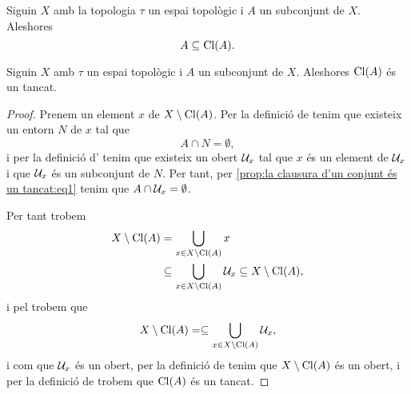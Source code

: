 \documentclass[../Apunts.tex]{subfiles}
\begin{document}
	\begin{observation}
		\label{obs:la clausura d'un conjunt conté el conjunt}
		Siguin \(X\) amb la topologia \(\tau\) un espai topològic i \(A\) un subconjunt de \(X\). Aleshores
		\[A\subseteq\operatorname{Cl}(A).\]
	\end{observation}
	\begin{proposition}
		\label{prop:la clausura d'un conjunt és un tancat}
		Siguin \(X\) amb \(\tau\) un espai topològic i \(A\) un subconjunt de \(X\). Aleshores \(\operatorname{Cl}(A)\) és un tancat.
		\begin{proof}
			 Prenem un element \(x\) de \(X\setminus\operatorname{Cl}(A)\). Per la definició de  tenim que existeix un entorn \(N\) de \(x\) tal que
			 \begin{equation}
			 	\label{prop:la clausura d'un conjunt és un tancat:eq1}
				 A\cap N=\emptyset,
			 \end{equation}
			 i per la definició d' tenim que existeix un obert \(\mathcal{U}_{x}\) tal que \(x\) és un element de \(\mathcal{U}_{x}\) i que \(\mathcal{U}_{x}\) és un subconjunt de \(N\). Per tant, per \eqref{prop:la clausura d'un conjunt és un tancat:eq1} tenim que \(A\cap\mathcal{U}_{x}=\emptyset\).
			 
			 Per tant trobem
			 \begin{align*}
				 X\setminus\operatorname{Cl}(A)&=\bigcup_{x\in X\setminus\operatorname{Cl}(A)}x \\
				 &\subseteq\bigcup_{x\in X\setminus\operatorname{Cl}(A)}\mathcal{U}_{x}\subseteq X\setminus\operatorname{Cl}(A),
			 \end{align*}
			 i pel  trobem que
			 \[X\setminus\operatorname{Cl}(A)=\subseteq\bigcup_{x\in X\setminus\operatorname{Cl}(A)}\mathcal{U}_{x},\]
			 i com que \(\mathcal{U}_{x}\) és un obert, per la definició de  tenim que \(X\setminus\operatorname{Cl}(A)\) és un obert, i per la definició de  trobem que \(\operatorname{Cl}(A)\) és un tancat.
		\end{proof}
	\end{proposition}
\end{document}
